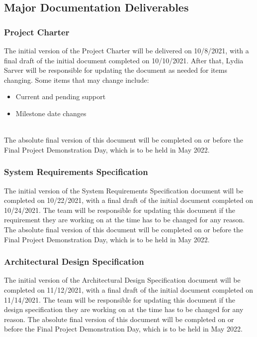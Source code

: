 
\subsection{Major Documentation Deliverables}

\subsubsection{Project Charter}
The initial version of the Project Charter will be delivered on 10/8/2021, with a final draft of the initial document completed on 10/10/2021. After that, Lydia Sarver will be responsible for updating the document as needed for items changing. Some items that may change include:
\begin{itemize}
  \item Current and pending support
  \item Milestone date changes
\end{itemize}
\\
The absolute final version of this document will be completed on or before the Final Project Demonstration Day, which is to be held in May 2022.

\subsubsection{System Requirements Specification}
The initial version of the System Requirements Specification document will be completed on 10/22/2021, with a final draft of the initial document completed on 10/24/2021. The team will be responsible for updating this document if the requirement they are working on at the time has to be changed for any reason. The absolute final version of this document will be completed on or before the Final Project Demonstration Day, which is to be held in May 2022.

\subsubsection{Architectural Design Specification}
The initial version of the Architectural Design Specification document will be completed on 11/12/2021, with a final draft of the initial document completed on 11/14/2021. The team will be responsible for updating this document if the design specification they are working on at the time has to be changed for any reason.  The absolute final version of this document will be completed on or before the Final Project Demonstration Day, which is to be held in May 2022.

